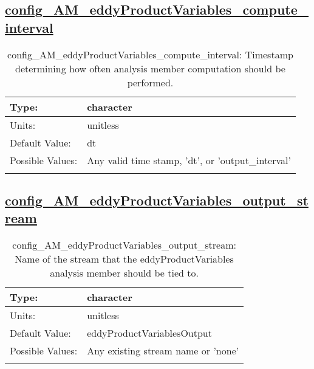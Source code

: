 \subsection[config\_AM\_eddyProductVariables\_compute\_interval]{\hyperref[sec:nm_tab_AM_eddyProductVariables]{config\_AM\_eddyProductVariables\_compute\_interval}}
\label{subsec:nm_sec_config_AM_eddyProductVariables_compute_interval}
\begin{center}
\begin{longtable}{| p{2.0in} || p{4.0in} |}
    \hline
    Type: & character \\
    \hline
    Units: & \si{unitless} \\
    \hline
    Default Value: & dt \\
    \hline
    Possible Values: & Any valid time stamp, 'dt', or 'output\_interval' \\
    \hline
    \caption{config\_AM\_eddyProductVariables\_compute\_interval: Timestamp determining how often analysis member computation should be performed.}
\end{longtable}
\end{center}
\subsection[config\_AM\_eddyProductVariables\_output\_stream]{\hyperref[sec:nm_tab_AM_eddyProductVariables]{config\_AM\_eddyProductVariables\_output\_stream}}
\label{subsec:nm_sec_config_AM_eddyProductVariables_output_stream}
\begin{center}
\begin{longtable}{| p{2.0in} || p{4.0in} |}
    \hline
    Type: & character \\
    \hline
    Units: & \si{unitless} \\
    \hline
    Default Value: & eddyProductVariablesOutput \\
    \hline
    Possible Values: & Any existing stream name or 'none' \\
    \hline
    \caption{config\_AM\_eddyProductVariables\_output\_stream: Name of the stream that the eddyProductVariables analysis member should be tied to.}
\end{longtable}
\end{center}
